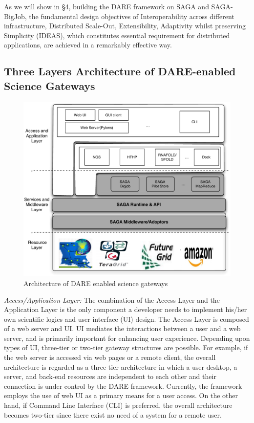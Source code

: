 \documentclass{sig-alternate}
\begin{document}
As we will show in \S4, building the DARE framework on SAGA and
SAGA-BigJob, the fundamental design objectives of Interoperability
across different infrastructure, Distributed Scale-Out, Extensibility,
Adaptivity whilst preserving Simplicity (IDEAS)\cite{ideas}, which
constitutes essential requirement for distributed applications, are
achieved in a remarkably effective way.

\subsection{Three Layers Architecture of DARE-enabled Science
  Gateways}


\begin{figure}
  \centering
  \includegraphics[scale=0.40]{figures/DAREOutline.pdf}
\caption{\small Architecture of DARE enabled science gateways }
  \label{fig:dare-arch} 
\end{figure}

\textit{Access/Application Layer:} The combination of the Access Layer
and the Application Layer is the only component a developer needs to
implement his/her own scientific logics and user interface (UI)
design.  The Access Layer is composed of a web server and UI.  UI
mediates the interactions between a user and a web server, and is
primarily important for enhancing user experience.  Depending upon
types of UI, three-tier or two-tier gateway structures are possible.
For example, if the web server is accessed via web pages or a remote
client, the overall architecture is regarded as a three-tier
architecture in which a user desktop, a server, and back-end resources
are independent to each other and their connection is under control by
the DARE framework.  Currently, the framework employs the use of web
UI as a primary means for a user access.  On the other hand, if
Command Line Interface (CLI) is preferred, the overall architecture
becomes two-tier since there exist no need of a system for a remote
user.
\end{document}
